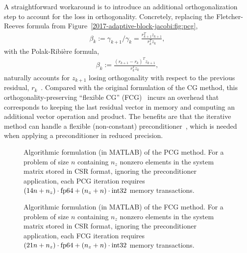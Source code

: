 A straightforward workaround is to introduce an additional orthogonalization
step to account for the loss in orthogonality. Concretely, replacing the
Fletcher-Reeves formula from Figure~\ref{2017-adaptive-block-jacobi:fig:pcg},
\begin{align}
\beta_{k}:=\gamma_{k+1}/\gamma_{k}=\frac{r_{k+1}^T z_{k+1}}{r_{k}^T z_{k}},
\label{2017-adaptive-block-jacobi:eq:fr}
\end{align}
with the Polak-Ribi\`{e}re formula,
\begin{align}
\beta_{k}:=\frac{(r_{k+1}-r_k)^T z_{k+1}}{r_{k}^T z_{k}},
\label{2017-adaptive-block-jacobi:eq:pr}
\end{align}
naturally accounts for $z_{k+1}$ losing orthogonality with respect to the
previous residual, $r_k$~\cite{doi:10.1137/S1064827597323415}. Compared
with the original formulation of the CG method, this
orthogonality-preserving ``flexible CG''
(FCG)~\cite{doi:10.1137/S1064827597323415} incurs an overhead that
corresponds to keeping the last residual vector in memory and computing an
additional vector operation and \dotp product. The benefits are that the
iterative method can handle a flexible (non-constant)
preconditioner~\cite{notay}, which is needed when applying a preconditioner in
reduced precision.

\begin{figure}
\begin{center}
\begin{minipage}{\columnwidth}
{\small

}
\end{minipage}
\caption{Algorithmic formulation (in MATLAB) of the PCG method.
For a problem of size $n$ containing $n_z$ nonzero elements in the system matrix
stored in CSR format, ignoring the preconditioner application, each PCG
iteration requires $(14n+n_z)\cdot\mbox{\rm fp64}+(n_z+n)\cdot\mbox{\rm int32}$ memory transactions.}
\label{2017-adaptive-block-jacobi:fig:codepcg}
\end{center}
\end{figure}

\begin{figure}
\begin{center}
\begin{minipage}{\columnwidth}
{\small

}
\end{minipage}
\caption{Algorithmic formulation (in MATLAB) of the FCG method.
For a problem of size $n$ containing $n_z$ nonzero elements in the system matrix
stored in CSR format, ignoring the preconditioner application, each FCG
iteration requires $(21n+n_z)\cdot\mbox{\rm fp64}+(n_z+n)\cdot\mbox{\rm int32}$ memory transactions.}
\label{2017-adaptive-block-jacobi:fig:codefcg}
\end{center}
\end{figure}


